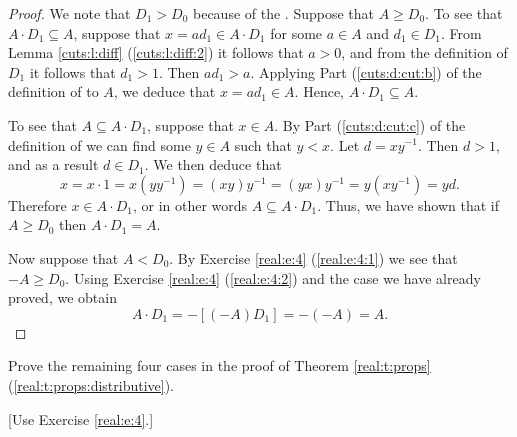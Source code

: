 \begin{proof}
	We note that $D_1 > D_0$ because of the . Suppose that $A \geq D_0$. To see that $A \cdot D_1 \subseteq A$, suppose that $x = a d_1 \in A \cdot D_1$ for some $a \in A$ and $d_1 \in D_1$. From Lemma \ref{cuts:l:diff} (\ref{cuts:l:diff:2}) it follows that $a > 0$, and from the definition of $D_1$ it follows that $d_1 > 1$. Then $a d_1 > a$. Applying Part (\ref{cuts:d:cut:b}) of the definition of  to $A$, we deduce that $x = a d_1 \in A$. Hence, $A \cdot D_1 \subseteq A$.

	To see that $A \subseteq A \cdot D_1$, suppose that $x \in A$. By Part (\ref{cuts:d:cut:c}) of the definition of  we can find some $y \in A$ such that $y < x$. Let $d = x y^{-1}$. Then $d > 1$, and as a result $d \in D_1$. We then deduce that
	$$
		x = x \cdot 1 = x (y y^{-1}) = (x y) y^{-1} = (y x) y^{-1} = y (x y^{-1}) = y d.
	$$
	Therefore $x \in A \cdot D_1$, or in other words $A \subseteq A \cdot D_1$. Thus, we have shown that if $A \geq D_0$ then $A \cdot D_1 = A$.

	Now suppose that $A < D_0$. By Exercise \ref{real:e:4} (\ref{real:e:4:1}) we see that $-A \geq D_0$. Using Exercise \ref{real:e:4} (\ref{real:e:4:2}) and the case we have already proved, we obtain
	$$
		A \cdot D_1 = - [(-A)D_1] = -(-A) = A.
	$$
\end{proof}


\Newpage
\begin{exercise} %
	\label{real:e:6}
	Prove the remaining four cases in the proof of Theorem \ref{real:t:props} (\ref{real:t:props:distributive}).

	\hfill [Use Exercise \ref{real:e:4}.]
\end{exercise}


